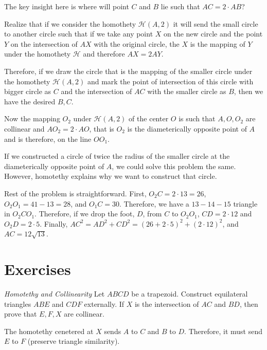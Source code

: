 \documentclass[11pt,twoside]{scrartcl}
\begin{document}
\begin{soln}
    The key insight here is where will point $C$ and $B$ lie such that $AC = 2 \cdot AB$? 

    Realize that if we consider the homothety $\mathcal{H}(A, 2)$ it will send the small circle to another circle such that if we take any point $X$ on the new circle and the point $Y$ on the intersection of $AX$ with the original circle, the $X$ is the mapping of $Y$ under the homothety $\mathcal{H}$ and therefore $AX = 2 AY$.

    Therefore, if we draw the circle that is the mapping of the smaller circle under the homothety $\mathcal{H}(A, 2)$ and mark the point of intersection of this circle with bigger circle as $C$ and the intersection of $AC$ with the smaller circle as $B$, then we have the desired $B, C$.

    Now the mapping $O_2$ under $\mathcal{H}(A, 2)$ of the center $O$ is such that $A, O, O_2$ are collinear and $AO_2 = 2 \cdot AO$, that is $O_2$ is the diameterically opposite point of $A$ and is therefore, on the line $OO_1$.
    
    \begin{note}
        If we constructed a circle of twice the radius of the smaller circle at the diameterically opposite point of $A$, we could solve this problem the same. However, homotethy explains why we want to construct that circle.
    \end{note}

    Rest of the problem is straightforward. First, $O_2C = 2 \cdot 13 = 26$, $O_2O_1 = 41 - 13 = 28$, and $O_1C = 30$. Therefore, we have a $13-14-15$ triangle in $O_2CO_1$. Therefore, if we drop the foot, $D$, from $C$ to $O_2O_1$, $CD = 2\cdot12$ and $O_2D = 2\cdot5$. Finally, $AC^2 = AD^2 + CD^2 = (26+2\cdot5)^2 + (2\cdot12)^2$, and $AC = \boxed{12\sqrt{13}}$.
\end{soln}
\clearpage
\section{Exercises}
\begin{problem}[2018 AMC 12 B, \#13]
    \TBD
    \begin{sketch}
        \TBD
    \end{sketch}
\end{problem}
\begin{problem}
    \textit{Homotethy and Collinearity} Let $ABCD$ be a trapezoid. Construct equilateral triangles $ABE$ and $CDF$ externally. If $X$ is the intersection of $AC$ and $BD$, then prove that $E, F, X$ are collinear.
    \begin{sketch}
        The homotethy cenetered at $X$ sends $A$ to $C$ and $B$ to $D$. Therefore, it must send $E$ to $F$ (preserve triangle similarity). 
    \end{sketch}
\end{problem}
\end{document}
